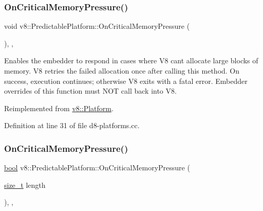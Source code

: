 \subsubsection{\texorpdfstring{On\+Critical\+Memory\+Pressure()}{OnCriticalMemoryPressure()}\hspace{0.1cm}{\footnotesize\ttfamily [1/2]}}
{\footnotesize\ttfamily void v8\+::\+Predictable\+Platform\+::\+On\+Critical\+Memory\+Pressure (\begin{DoxyParamCaption}{ }\end{DoxyParamCaption})\hspace{0.3cm}{\ttfamily [inline]}, {\ttfamily [override]}, {\ttfamily [virtual]}}

Enables the embedder to respond in cases where V8 can\textquotesingle{}t allocate large blocks of memory. V8 retries the failed allocation once after calling this method. On success, execution continues; otherwise V8 exits with a fatal error. Embedder overrides of this function must N\+OT call back into V8. 

Reimplemented from \mbox{\hyperlink{classv8_1_1Platform_a7ed41bddc1d1ebe51c55539198d0026e}{v8\+::\+Platform}}.



Definition at line 31 of file d8-\/platforms.\+cc.

\mbox{\label{classv8_1_1PredictablePlatform_a358d24a36a74e1c9e2a9bbae6e81bff1}} 
\subsubsection{\texorpdfstring{On\+Critical\+Memory\+Pressure()}{OnCriticalMemoryPressure()}\hspace{0.1cm}{\footnotesize\ttfamily [2/2]}}
{\footnotesize\ttfamily \mbox{\hyperlink{classbool}{bool}} v8\+::\+Predictable\+Platform\+::\+On\+Critical\+Memory\+Pressure (\begin{DoxyParamCaption}\item[{\mbox{\hyperlink{classsize__t}{size\+\_\+t}}}]{length }\end{DoxyParamCaption})\hspace{0.3cm}{\ttfamily [inline]}, {\ttfamily [override]}, {\ttfamily [virtual]}}

